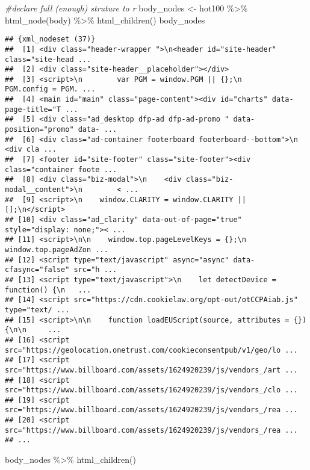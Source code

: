 \documentclass[
]{article}
\newenvironment{Shaded}{\begin{snugshade}}{\end{snugshade}}
\newcommand{\CommentTok}[1]{\textcolor[rgb]{0.56,0.35,0.01}{\textit{#1}}}
\newcommand{\FunctionTok}[1]{\textcolor[rgb]{0.00,0.00,0.00}{#1}}
\newcommand{\NormalTok}[1]{#1}
\newcommand{\OtherTok}[1]{\textcolor[rgb]{0.56,0.35,0.01}{#1}}
\newcommand{\SpecialCharTok}[1]{\textcolor[rgb]{0.00,0.00,0.00}{#1}}
\newcommand{\StringTok}[1]{\textcolor[rgb]{0.31,0.60,0.02}{#1}}
\begin{document}
\begin{Shaded}
\begin{Highlighting}[]
\CommentTok{\#declare full (enough) struture to r}
\NormalTok{body\_nodes }\OtherTok{\textless{}{-}}\NormalTok{ hot100 }\SpecialCharTok{\%\textgreater{}\%} 
  \FunctionTok{html\_node}\NormalTok{(}\StringTok{\textquotesingle{}body\textquotesingle{}}\NormalTok{) }\SpecialCharTok{\%\textgreater{}\%} 
  \FunctionTok{html\_children}\NormalTok{()}
\NormalTok{body\_nodes}
\end{Highlighting}
\end{Shaded}

\begin{verbatim}
## {xml_nodeset (37)}
##  [1] <div class="header-wrapper ">\n<header id="site-header" class="site-head ...
##  [2] <div class="site-header__placeholder"></div>
##  [3] <script>\n        var PGM = window.PGM || {};\n        PGM.config = PGM. ...
##  [4] <main id="main" class="page-content"><div id="charts" data-page-title="T ...
##  [5] <div class="ad_desktop dfp-ad dfp-ad-promo " data-position="promo" data- ...
##  [6] <div class="ad-container footerboard footerboard--bottom">\n    <div cla ...
##  [7] <footer id="site-footer" class="site-footer"><div class="container foote ...
##  [8] <div class="biz-modal">\n    <div class="biz-modal__content">\n        < ...
##  [9] <script>\n    window.CLARITY = window.CLARITY || [];\n</script>
## [10] <div class="ad_clarity" data-out-of-page="true" style="display: none;">< ...
## [11] <script>\n\n    window.top.pageLevelKeys = {};\n    window.top.pageAdZon ...
## [12] <script type="text/javascript" async="async" data-cfasync="false" src="h ...
## [13] <script type="text/javascript">\n    let detectDevice = function() {\n   ...
## [14] <script src="https://cdn.cookielaw.org/opt-out/otCCPAiab.js" type="text/ ...
## [15] <script>\n\n    function loadEUScript(source, attributes = {}) {\n\n     ...
## [16] <script src="https://geolocation.onetrust.com/cookieconsentpub/v1/geo/lo ...
## [17] <script src="https://www.billboard.com/assets/1624920239/js/vendors_/art ...
## [18] <script src="https://www.billboard.com/assets/1624920239/js/vendors_/clo ...
## [19] <script src="https://www.billboard.com/assets/1624920239/js/vendors_/rea ...
## [20] <script src="https://www.billboard.com/assets/1624920239/js/vendors_/rea ...
## ...
\end{verbatim}

\begin{Shaded}
\begin{Highlighting}[]
\NormalTok{body\_nodes }\SpecialCharTok{\%\textgreater{}\%} 
  \FunctionTok{html\_children}\NormalTok{()}
\end{Highlighting}
\end{Shaded}
\end{document}
